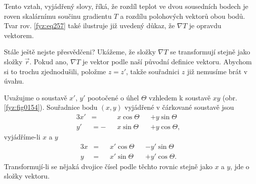       Tento vztah, vyjádřený slovy, říká, že rozdíl teplot ve dvou sousedních bodech je roven 
      skalárnímu součinu gradientu $T$ a rozdílu polohových vektorů obou bodů. Tvar rov. 
      \ref{fyz:eq257} také ilustruje již uvedený důkaz, že  $\nabla T$ je opravdu vektorem.
  
      Stále ještě nejste přesvědčeni? Ukážeme, že složky $\nabla T$ se transformují stejně jako 
      složky $\vec{r}$. Pokud ano, $\nabla T$ je vektor podle naší původní definice vektoru. Abychom 
      si to trochu zjednodušili, položme $z=z'$, takže souřadnici $z$ již nemusíme brát v úvahu.
  
      Uvažujme o soustavě $x'$, $y'$ pootočené o úhel $\Theta$  vzhledem k soustavě $xy$ (obr.
      \ref{fyz:fig0154}). Souřadnice bodu $(x,y)$ vyjádřené v čárkované soustavě jsou
      \begin{alignat*}{3}
        x' &=  &&x\cos\Theta &&+ y\sin\Theta             \\
        y' &= -&&x\sin\Theta &&+ y\cos\Theta,            
      \end{alignat*}
      vyjádříme-li \(x\) a \(y\)
      \begin{alignat}{3}
        x  &= &&x'\cos\Theta &&- y'\sin\Theta    \label{fyz:eq253}\\
        y  &= &&x'\sin\Theta &&+ y'\cos\Theta.  \nonumber
      \end{alignat}
      Transformují-li se nějaká dvojice čísel podle těchto rovnic stejně jako \(x\) a \(y\), jde o složky
      vektoru.
  
